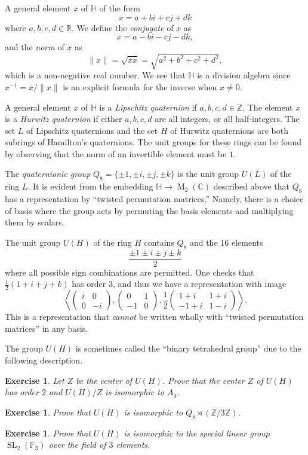 \documentclass[12pt]{article}
\theoremstyle{plain}
\newtheorem{exercise}[theorem]{Exercise}
\theoremstyle{definition}
\theoremstyle{remark}
\numberwithin{equation}{section}
\begin{document}
A general element $x$ of $\mathbb{H}$ of the form
\[
x = a + bi + cj + dk
\]
where $a,b,c,d \in \mathbb{R}$.
We define the \emph{conjugate} of $x$ as
\[
\overline{x} = a -bi-cj-dk,
\]
and the \emph{norm} of $x$ as
\[
\|x\| = \sqrt{\overline{x} x} = \sqrt{a^2+b^2+c^2+d^2},
\]
which is a non-negative real number.
We see that $\mathbb{H}$ is a division algebra
since $x^{-1} = \overline{x}/\|x\|$ is an explicit formula for the
inverse when $x \ne 0$.

A general element $x$ of $\mathbb{H}$
is a \emph{Lipschitz quaternion} if
$a,b,c,d \in \mathbb{Z}$.
The element $x$ is a \emph{Hurwitz quaternion}
if either $a,b,c,d$ are all integers, or all half-integers.
The set $L$ of Lipschitz quaternions and the set $H$ of Hurwitz
quaternions are both subrings of Hamilton's quaternions.
The unit groups for these rings can be found by observing that the norm of
an invertible element must be $1$.

The \emph{quaternionic group} $Q_8 = \{\pm 1, \pm i, \pm j, \pm k\}$ is
the unit group $U(L)$ of the ring $L$.
It is evident from the embedding
$\mathbb{H} \to \operatorname{M}_2(\mathbb{C})$ described above
that $Q_8$ has a representation by ``twisted permutation
matrices.''
Namely, there is a choice of basis where the group acts by permuting
the basis elements and multiplying them by scalars.

The unit group $U(H)$ of the ring $H$ contains $Q_8$ and the 16 elements
\[
\frac{ \pm 1 \pm i \pm j \pm k }{2}
\]
where all possible sign combinations are permitted.
One checks that $\frac{1}{2}(1+i+j+k)$ has order $3$, and thus we have a
representation with image
\[
\left\langle \begin{pmatrix} i&0\\0&-i \end{pmatrix},
\begin{pmatrix} 0&1\\-1&0 \end{pmatrix},
\frac{1}{2} \begin{pmatrix} 1+i&1+i\\-1+i&1-i \end{pmatrix}\right\rangle
.
\]
This is a representation that \emph{cannot} be written wholly with
``twisted permutation matrices'' in any basis.

The group $U(H)$ is sometimes called the ``binary tetrahedral group''
due to the following description.

\begin{exercise}
Let $Z$ be the center of $U(H)$.
Prove that the center $Z$ of $U(H)$ has order $2$ and
$U(H)/Z $ is isomorphic to $A_4$.
\end{exercise}

\begin{exercise}
Prove that $U(H)$ is isomorphic to $Q_8 \rtimes (\mathbb{Z}/3\mathbb{Z})$.
\end{exercise}

\begin{exercise}
Prove that $U(H)$ is isomorphic to the special linear group
$\operatorname{SL}_2(\mathbb{F}_3)$ over the field of $3$ elements.
\end{exercise}




\end{document}
